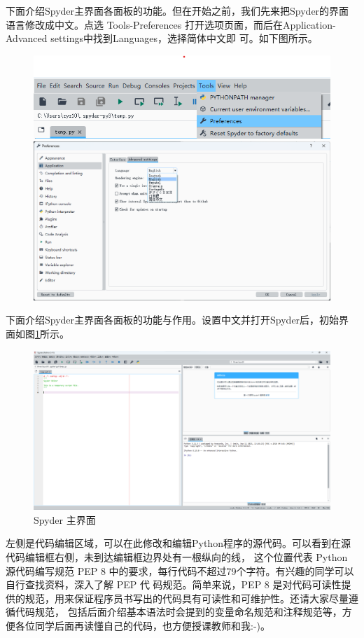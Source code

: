 下面介绍Spyder主界面各面板的功能。但在开始之前，我们先来把Spyder的界面语言修改成中文。点选 
Tools-Preferences 打开选项页面，而后在Application-Advanced settings中找到Languages，选择简体中文即
可。如下图所示。
\begin{figure}[htbp]
    \begin{minipage}[h]{0.3\linewidth}
        \centering
        \includegraphics*[height=0.3\linewidth]{pic/Spyder_Language_1.png}
    \end{minipage}
    \hfill
    \begin{minipage}[h]{0.6\linewidth}
        \centering
        \includegraphics*[height=0.4\linewidth]{pic/Spyder_Language_2.png}
    \end{minipage}
\end{figure}
\newpage
下面介绍Spyder主界面各面板的功能与作用。设置中文并打开Spyder后，初始界面如图\ref{fig:spyderMain}所示。
\begin{figure}[htbp]
    \centering
    \includegraphics[width=0.7\linewidth]{pic/spyder主界面.png}
    \caption{Spyder 主界面}
    \label{fig:spyderMain}
\end{figure}
左侧是代码编辑区域，可以在此修改和编辑Python程序的源代码。可以看到在源代码编辑框右侧，未到达编辑框边界处有一根纵向的线，
这个位置代表 Python 源代码编写规范 PEP 8 中的要求，每行代码不超过79个字符。有兴趣的同学可以自行查找资料，深入了解 PEP 代
码规范。简单来说，PEP 8 是对代码可读性提供的规范，用来保证程序员书写出的代码具有可读性和可维护性。还请大家尽量遵循代码规范，
包括后面介绍基本语法时会提到的变量命名规范和注释规范等，方便各位同学后面再读懂自己的代码，也方便授课教师和我:-)。

